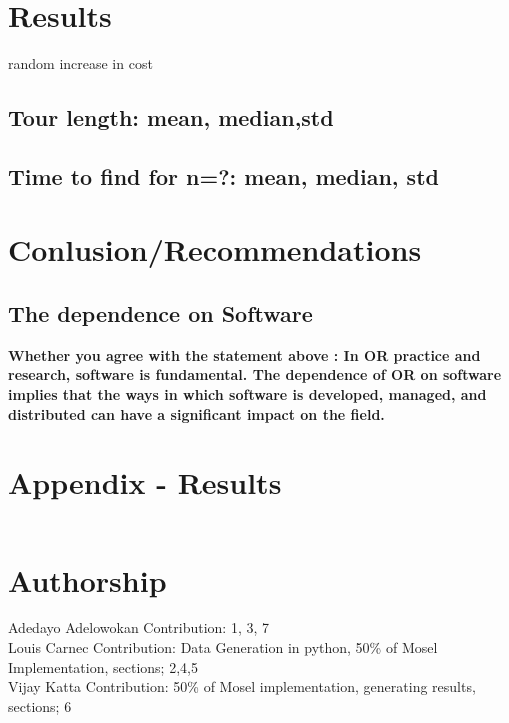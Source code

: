 \documentclass[a4paper,11pt]{article}
\begin{document}
\section{Results}

random increase in cost

\subsection{Tour length: mean, median,std}

\subsection{Time to find for n=?: mean, median, std}

\section{Conlusion/Recommendations}

\subsection{The dependence on Software}
\textbf{Whether you agree with the statement above : In OR practice and research, software is fundamental. The dependence
of OR on software implies that the ways in which software is developed, managed, and distributed can
have a significant impact on the field.}

























\clearpage
\section*{Appendix - Results}

\begin{lstlisting}

\end{lstlisting}

\section*{Authorship}

Adedayo Adelowokan Contribution: 1, 3, 7 \\
\newline
Louis Carnec Contribution: Data Generation in python, 50\% of Mosel Implementation, sections; 2,4,5 \\
\newline
Vijay Katta Contribution: 50\% of Mosel implementation, generating results, sections; 6 \\


\clearpage


\end{document}
